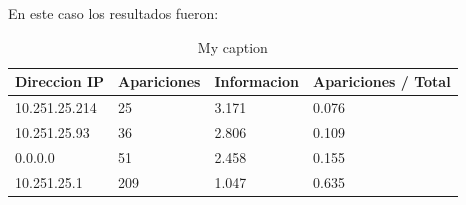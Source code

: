 En este caso los resultados fueron:


\begin{table}[H]
\centering
\caption{My caption}
\label{my-label}
\begin{tabular}{@{}llll@{}}
\toprule
Direccion IP  & Apariciones & Informacion & Apariciones / Total \\ \midrule
10.251.25.214 & 25          & 3.171       & 0.076               \\
10.251.25.93  & 36          & 2.806       & 0.109               \\
0.0.0.0       & 51          & 2.458       & 0.155               \\
10.251.25.1   & 209         & 1.047       & 0.635              
\end{tabular}
\end{table}


